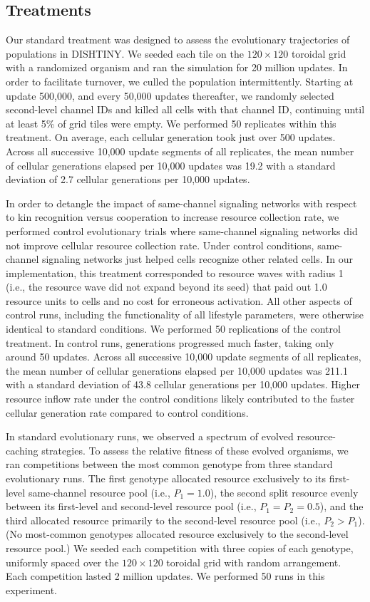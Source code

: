 {\subsection{Treatments}

Our standard treatment was designed to assess the evolutionary trajectories of populations in DISHTINY.
We seeded each tile on the $120 \times 120$ toroidal grid with a randomized organism and ran the simulation for 20 million updates.
In order to facilitate turnover, we culled the population intermittently.
Starting at update 500,000, and every 50,000 updates thereafter, we randomly selected second-level channel IDs and killed all cells with that channel ID, continuing until at least 5\% of grid tiles were empty.
We performed 50 replicates within this treatment.
On average, each cellular generation took just over 500 updates.
Across all successive 10,000 update segments of all replicates, the mean number of cellular generations elapsed per 10,000 updates was 19.2 with a standard deviation of 2.7 cellular generations per 10,000 updates.

In order to detangle the impact of same-channel signaling networks with respect to kin recognition versus cooperation to increase resource collection rate, we performed control evolutionary trials where same-channel signaling networks did not improve cellular resource collection rate.
Under control conditions, same-channel signaling networks just helped cells recognize other related cells.
In our implementation, this treatment corresponded to resource waves with radius 1 (i.e., the resource wave did not expand beyond its seed) that paid out 1.0 resource units to cells and no cost for erroneous activation.
All other aspects of control runs, including the functionality of all lifestyle parameters, were otherwise identical to standard conditions.
We performed 50 replications of the control treatment.
In control runs, generations progressed much faster, taking only around 50 updates.
Across all successive 10,000 update segments of all replicates, the mean number of cellular generations elapsed per 10,000 updates was 211.1 with a standard deviation of 43.8 cellular generations per 10,000 updates.
Higher resource inflow rate under the control conditions likely contributed to the faster cellular generation rate compared to control conditions.

In standard evolutionary runs, we observed a spectrum of evolved resource-caching strategies.
To assess the relative fitness of these evolved organisms, we ran competitions between the most common genotype from three standard evolutionary runs.
The first genotype allocated resource exclusively to its first-level same-channel resource pool (i.e., $P_{1} = 1.0$), the second split resource evenly between its first-level and second-level resource pool (i.e., $P_{1} = P_{2} = 0.5$), and the third allocated resource primarily to the second-level resource pool (i.e., $P_{2} > P_{1}$).
(No most-common genotypes allocated resource exclusively to the second-level resource pool.)
We seeded each competition with three copies of each genotype, uniformly spaced over the $120 \times 120$ toroidal grid with random arrangement.
Each competition lasted 2 million updates.
We performed 50 runs in this experiment.

}
